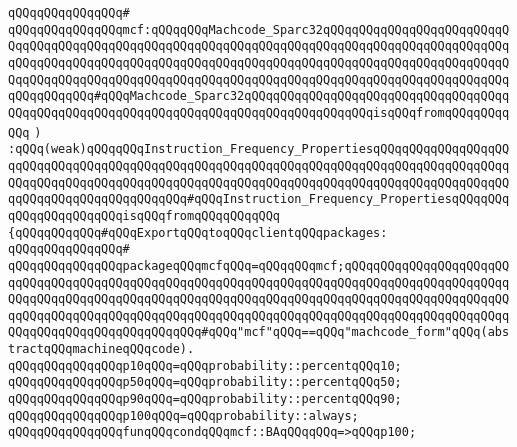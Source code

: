 \verb|qQQqqQQqqQQqqQQq#|\newline
\verb|qQQqqQQqqQQqqQQqmcf:qQQqqQQqMachcode_Sparc32qQQqqQQqqQQqqQQqqQQqqQQqqQQqqQQqqQQqqQQqqQQqqQQqqQQqqQQqqQQqqQQqqQQqqQQqqQQqqQQqqQQqqQQqqQQqqQQqqQQqqQQqqQQqqQQqqQQqqQQqqQQqqQQqqQQqqQQqqQQqqQQqqQQqqQQqqQQqqQQqqQQqqQQqqQQqqQQqqQQqqQQqqQQqqQQqqQQqqQQqqQQqqQQqqQQqqQQqqQQqqQQqqQQqqQQqqQQqqQQqqQQqqQQq#qQQqMachcode_Sparc32qQQqqQQqqQQqqQQqqQQqqQQqqQQqqQQqqQQqqQQqqQQqqQQqqQQqqQQqqQQqqQQqqQQqqQQqqQQqqQQqqQQqqQQqisqQQqfromqQQqqQQqqQQq|\newline
\verb|)|\newline
\newline
\verb|:qQQq(weak)qQQqqQQqInstruction_Frequency_PropertiesqQQqqQQqqQQqqQQqqQQqqQQqqQQqqQQqqQQqqQQqqQQqqQQqqQQqqQQqqQQqqQQqqQQqqQQqqQQqqQQqqQQqqQQqqQQqqQQqqQQqqQQqqQQqqQQqqQQqqQQqqQQqqQQqqQQqqQQqqQQqqQQqqQQqqQQqqQQqqQQqqQQqqQQqqQQqqQQqqQQqqQQq#qQQqInstruction_Frequency_PropertiesqQQqqQQqqQQqqQQqqQQqqQQqisqQQqfromqQQqqQQqqQQq|\newline
\newline
\verb|{qQQqqQQqqQQq#qQQqExportqQQqtoqQQqclientqQQqpackages:|\newline
\verb|qQQqqQQqqQQqqQQq#|\newline
\verb|qQQqqQQqqQQqqQQqpackageqQQqmcfqQQq=qQQqqQQqmcf;qQQqqQQqqQQqqQQqqQQqqQQqqQQqqQQqqQQqqQQqqQQqqQQqqQQqqQQqqQQqqQQqqQQqqQQqqQQqqQQqqQQqqQQqqQQqqQQqqQQqqQQqqQQqqQQqqQQqqQQqqQQqqQQqqQQqqQQqqQQqqQQqqQQqqQQqqQQqqQQqqQQqqQQqqQQqqQQqqQQqqQQqqQQqqQQqqQQqqQQqqQQqqQQqqQQqqQQqqQQqqQQqqQQqqQQqqQQqqQQqqQQqqQQqqQQqqQQqqQQq#qQQq"mcf"qQQq==qQQq"machcode_form"qQQq(abstractqQQqmachineqQQqcode).|\newline
\newline
\verb|qQQqqQQqqQQqqQQqp10qQQq=qQQqprobability::percentqQQq10;|\newline
\verb|qQQqqQQqqQQqqQQqp50qQQq=qQQqprobability::percentqQQq50;|\newline
\verb|qQQqqQQqqQQqqQQqp90qQQq=qQQqprobability::percentqQQq90;|\newline
\verb|qQQqqQQqqQQqqQQqp100qQQq=qQQqprobability::always;|\newline
\newline
\verb|qQQqqQQqqQQqqQQqfunqQQqcondqQQqmcf::BAqQQqqQQq=>qQQqp100;|\newline
